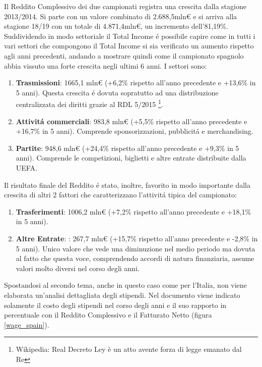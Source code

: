 \documentclass[
    corpo=12pt,
    oneside,
    evenboxes,
    tipotesi=triennale,
    stile=classica,
    oldstyle,
    autoretitolo,
    greek,
]{toptesi}
\begin{document}
\begin{interlinea}{1.5}
Il Reddito Complessivo dei due campionati registra una crescita 
dalla stagione 2013/2014. Si parte con un valore combinato di 2.688,5mln€ e si arriva alla stagione 18/19 con un totale di 4.871,4mln€, 
un incremento dell'81,19\%. 
Suddividendo in modo settoriale il Total Income \'e possibile capire come in tutti i vari settori che compongono il Total Income 
si sia verificato un aumento rispetto agli anni precedenti, andando a mostrare quindi come il campionato spagnolo abbia vissuto una forte crescita negli ultimi 6 anni.
I settori sono:
\begin{enumerate}
    \item \textbf{Trasmissioni}: 1665,1 mln€ (+6,2\% rispetto all'anno precedente e +13,6\% in 5 anni). Questa crescita \'e dovuta sopratutto ad una distribuzione 
    centralizzata dei diritti grazie al RDL 5/2015 \footnote{Wikipedia: Real Decreto Ley è un atto avente forza di legge emanato dal Re}.
    \item \textbf{Attivit\'a commerciali}: 983,8 mln€ (+5,5\% rispetto all'anno precedente e +16,7\% in 5 anni). Comprende sponsorizzazioni,
    pubblicit\'a e merchandising.
    \item \textbf{Partite}: 948,6 mln€ (+24,4\% rispetto all'anno precedente e +9,3\% in 5 anni). Comprende le competizioni, biglietti 
    e altre entrate distribuite dalla UEFA.
\end{enumerate}
Il risultato finale del Reddito \'e stato, inoltre, favorito in modo importante dalla crescita di altri 2 fattori che caratterizzano l'attivit\'a tipica del
campionato:
\begin{enumerate}
    \item \textbf{Trasferimenti}: 1006,2 mln€ (+7,2\% rispetto all'anno precedente e +18,1\% in 5 anni).
    \item \textbf{Altre Entrate}: : 267,7 mln€ (+15,7\% rispetto all'anno precedente e -2,8\% in 5 anni). Unico valore che vede una diminuzione
    nel medio periodo ma dovuta al fatto che questa voce, comprendendo accordi di natura finanziaria, assume valori molto diversi nel corso degli anni.
\end{enumerate}
Spostandosi al secondo tema, anche in questo caso come per l'Italia, non viene elaborata un'analisi dettagliata degli stipendi. Nel documento
viene indicato solamente il costo degli stipendi nel corso degli anni e il suo rapporto in percentuale con il Reddito Complessivo e il Fatturato Netto
(figura \ref{wage_spain}).
\begin{figure}
    \centering

\end{figure}
\end{interlinea}
\end{document}
